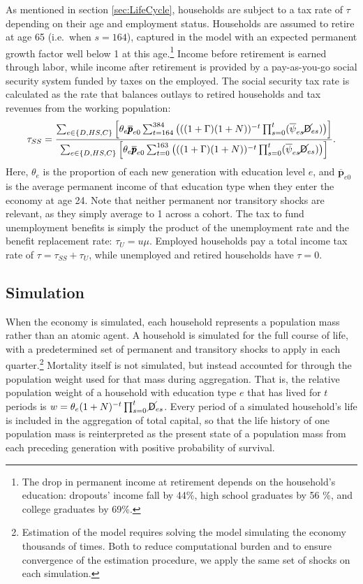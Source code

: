 \documentclass{econtex}\usepackage[pdftex]{graphicx}\usepackage{epstopdf} \usepackage[pdftex]{hyperref}
\newcommand{\PDies}{\ensuremath{\mathsf{D}}}
\newcommand{\pLev}{\ensuremath{\pmb{p}}}
\newcommand{\PLives}{\ensuremath{\cancel{\PDies}}}
\newcommand{\pshk}{\psi} %
\newcommand{\urate}{\ensuremath{u}}
\begin{document}
As mentioned in section \ref{sec:LifeCycle}, households are subject to a tax rate of $\tau$ depending on their age and employment status.  Households are assumed to retire at age 65 (i.e.\ when $s = 164$), captured in the model with an expected permanent growth factor well below 1 at this age.\footnote{The drop in permanent income at retirement depends on the household's education: dropouts' income fall by 44\%, high school graduates by 56 \%, and college graduates by 69\%.}  Income before retirement is earned through labor, while income after retirement is provided by a pay-as-you-go social security system funded by taxes on the employed.  The social security tax rate is calculated as the rate that balances outlays to retired households and tax revenues from the working population:
\begin{equation*}
\tau_{SS} = \frac{\sum_{e \in \{D,HS,C\}} \Big[ \theta_e \overline{\pLev}_{e0} \sum_{t = 164}^{384} \big( ((1 + \Gamma)(1+N))^{-t} \prod_{s=0}^t ( \overline{\pshk}_{es} \PLives_{es} ) \big) \Big]}
{\sum_{e \in \{D,HS,C\}} \Big[ \theta_e \overline{\pLev}_{e0} \sum_{t = 0}^{163} \big( ((1 + \Gamma)(1+N) )^{-t} \prod_{s=0}^t ( \overline{\pshk}_{es} \PLives_{es} ) \big) \Big]}.
\end{equation*}
Here, $\theta_e$ is the proportion of each new generation with education level $e$, and $\overline{\pLev}_{e0}$ is the average permanent income of that education type when they enter the economy at age 24.  Note that neither permanent nor transitory shocks are relevant, as they simply average to 1 across a cohort.  The tax to fund unemployment benefits is simply the product of the unemployment rate and the benefit replacement rate: $\tau_U = \urate \mu$.  Employed households pay a total income tax rate of $\tau = \tau_{SS} + \tau_U$, while unemployed and retired households have $\tau = 0$.

\subsection{Simulation}

When the economy is simulated, each household represents a population mass rather than an atomic agent.  A household is simulated for the full course of life, with a predetermined set of permanent and transitory shocks to apply in each quarter.\footnote{Estimation of the model requires solving the model simulating the economy thousands of times.  Both to reduce computational burden and to ensure convergence of the estimation procedure, we apply the same set of shocks on each simulation.}  Mortality itself is not simulated, but instead accounted for through the population weight used for that mass during aggregation.  That is, the relative population weight of a household with education type $e$ that has lived for $t$ periods is $w = \theta_e (1 + N)^{-t} \prod_{s=0}^t \PLives_{es}$.  Every period of a simulated household's life is included in the aggregation of total capital, so that the life history of one population mass is reinterpreted as the present state of a population mass from each preceding generation with positive probability of survival.
\end{document}
